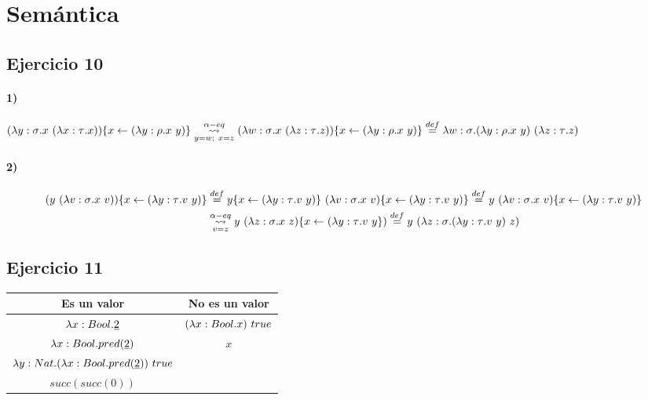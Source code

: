\documentclass[10pt,a4paper, landscape]{article}
\begin{document}
\section*{\centering Semántica}
\subsection{Ejercicio 10}
\paragraph{1)} $(\lambda y: \sigma \text{.} x~(\lambda x: \tau \text{.} x))\{x\leftarrow(\lambda y: \rho \text{.} x~y)\}
\underset{y=w;~x=z}{\overset{\alpha-eq}{\leadsto}}(\lambda w: \sigma \text{.} x~(\lambda z: \tau \text{.} z))\{x\leftarrow(\lambda y: \rho \text{.} x~y)\} 
\overset{def}{=} \lambda w: \sigma \text{.} (\lambda y: \rho \text{.} x~y)~(\lambda z: \tau \text{.} z)$

\paragraph{2)}
\begin{equation*}
\begin{split}
(y~(\lambda v: \sigma \text{.} x~v))\{x\leftarrow(\lambda y: \tau \text{.} v~y)\} 
&\overset{def}{=} y\{x\leftarrow(\lambda y: \tau \text{.} v~y)\}~(\lambda v: \sigma \text{.} x~v)\{x\leftarrow(\lambda y: \tau \text{.} v~y)\}
\overset{def}{=}
y~(\lambda v: \sigma \text{.} x~v)\{x\leftarrow(\lambda y: \tau \text{.} v~y)\} \\
&\underset{v=z}{\overset{\alpha-eq}{\leadsto}}
y~(\lambda z: \sigma \text{.} x~z)\{x\leftarrow(\lambda y: \tau \text{.} v~y\}) 
\overset{def}{=} y~(\lambda z: \sigma \text{.} (\lambda y: \tau \text{.} v~y)~z)
\end{split}
\end{equation*}

\subsection{Ejercicio 11}
\begin{center}
\begin{tabular}{c|c}
\textbf{Es un valor} & \textbf{No es un valor} \\
\hline
$\lambda x:  Bool \text{.} \underline{2}$ & $(\lambda x:  Bool \text{.} x)~true$ \\
$\lambda x:  Bool \text{.} pred(\underline{2})$ &  $x$ \\
$\lambda y:  Nat \text{.} (\lambda x:  Bool \text{.} pred(\underline{2}))~true$ &  \\
$succ(succ(0))$ &  \\
\end{tabular}
\end{center}
\end{document}
